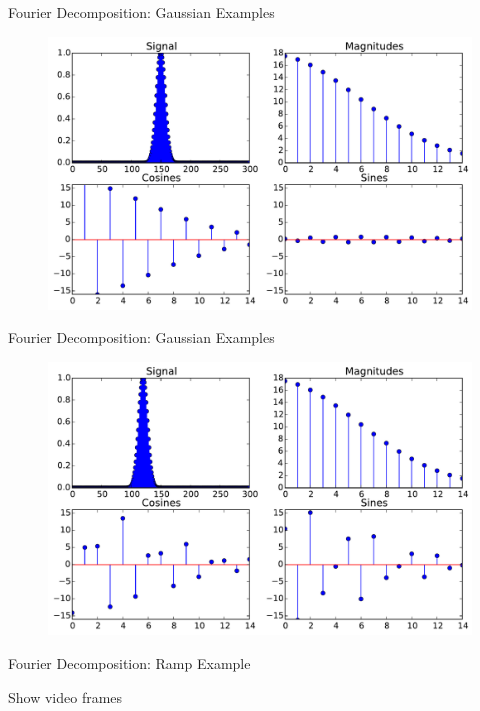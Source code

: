 \documentclass{beamer}
\begin{document}
\begin{frame}{Fourier Decomposition: Gaussian Examples}

\begin{figure}[t]
    \includegraphics[width=\textwidth]{GaussSig10_1/SignalDecomposition.pdf}
\end{figure}

\end{frame}

\begin{frame}{Fourier Decomposition: Gaussian Examples}

\begin{figure}[t]
    \includegraphics[width=\textwidth]{GaussSig10_2/SignalDecomposition.pdf}
\end{figure}

\end{frame}


\begin{frame}{Fourier Decomposition: Ramp Example}

Show video frames

\end{frame}
\end{document}
